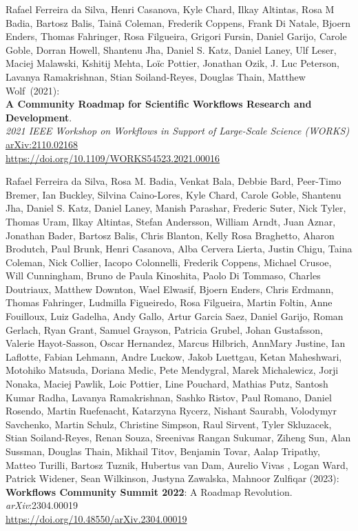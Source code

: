 \begin{thebibliography}{9}
Rafael Ferreira da Silva, Henri Casanova, Kyle Chard, Ilkay
Altintas, Rosa M Badia, Bartosz Balis, Tainã Coleman, Frederik Coppens,
Frank Di Natale, Bjoern Enders, Thomas Fahringer, Rosa Filgueira,
Grigori Fursin, Daniel Garijo, Carole Goble, Dorran Howell, Shantenu
Jha, Daniel S. Katz, Daniel Laney, Ulf Leser, Maciej Malawski, Kshitij
Mehta, Loïc Pottier, Jonathan Ozik, J. Luc Peterson, Lavanya
Ramakrishnan, Stian Soiland-Reyes, Douglas Thain, Matthew Wolf~(2021):\\
\textbf{A Community Roadmap for Scientific Workflows Research and
Development}.\\
\emph{2021 IEEE Workshop on Workflows in Support of Large-Scale Science (WORKS)}\\
\href{https://arxiv.org/abs/2110.02168}{arXiv:2110.02168}\\
\url{https://doi.org/10.1109/WORKS54523.2021.00016}

Rafael Ferreira da Silva, Rosa M. Badia, Venkat Bala, Debbie Bard, Peer-Timo Bremer, Ian Buckley, Silvina Caino-Lores, Kyle Chard, Carole Goble, Shantenu Jha, Daniel S. Katz, Daniel Laney, Manish Parashar, Frederic Suter, Nick Tyler, Thomas Uram, Ilkay Altintas, Stefan Andersson, William Arndt, Juan Aznar, Jonathan Bader, Bartosz Balis, Chris Blanton, Kelly Rosa Braghetto, Aharon Brodutch, Paul Brunk, Henri Casanova, Alba Cervera Lierta, Justin Chigu, Taina Coleman, Nick Collier, Iacopo Colonnelli, Frederik Coppens, Michael Crusoe, Will Cunningham, Bruno de Paula Kinoshita, Paolo Di Tommaso, Charles Doutriaux, Matthew Downton, Wael Elwasif, Bjoern Enders, Chris Erdmann, Thomas Fahringer, Ludmilla Figueiredo, Rosa Filgueira, Martin Foltin, Anne Fouilloux, Luiz Gadelha, Andy Gallo, Artur Garcia Saez, Daniel Garijo, Roman Gerlach, Ryan Grant, Samuel Grayson, Patricia Grubel, Johan Gustafsson, Valerie Hayot-Sasson, Oscar Hernandez, Marcus Hilbrich, AnnMary Justine, Ian Laflotte, Fabian Lehmann, Andre Luckow, Jakob Luettgau, Ketan Maheshwari, Motohiko Matsuda, Doriana Medic, Pete Mendygral, Marek Michalewicz, Jorji Nonaka, Maciej Pawlik, Loic Pottier, Line Pouchard, Mathias Putz, Santosh Kumar Radha, Lavanya Ramakrishnan, Sashko Ristov, Paul Romano, Daniel Rosendo, Martin Ruefenacht, Katarzyna Rycerz, Nishant Saurabh, Volodymyr Savchenko, Martin Schulz, Christine Simpson, Raul Sirvent, Tyler Skluzacek, Stian Soiland-Reyes, Renan Souza, Sreenivas Rangan Sukumar, Ziheng Sun, Alan Sussman, Douglas Thain, Mikhail Titov, Benjamin Tovar, Aalap Tripathy, Matteo Turilli, Bartosz Tuznik, Hubertus van Dam, Aurelio Vivas , Logan Ward, Patrick Widener, Sean Wilkinson, Justyna Zawalska, Mahnoor Zulfiqar (2023):\\
\textbf{Workflows Community Summit 2022}: A Roadmap Revolution.\\
\emph{arXiv}:2304.00019\\
\url{https://doi.org/10.48550/arXiv.2304.00019}


\end{thebibliography}
